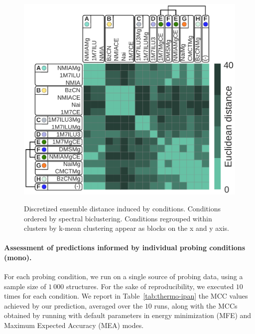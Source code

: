 \documentclass[a4,center,fleqn]{NAR}
\begin{document}
\begin{figure}
	{\centering \includegraphics[width=\linewidth]{graphs/didy/bi_clustering}\\}%
	
	\caption{Discretized ensemble distance induced by conditions. Conditions ordered by spectral biclustering. Conditions regrouped within clusters by k-mean clustering appear as blocks on the x and y axis.}\label{fig:biclustering}
\end{figure}







\paragraph{Assessment of predictions informed by individual probing conditions (mono).}



For each probing condition, we run \OurTool{} on a single source of probing data, using a sample size of $1~000$ structures. For the sake of reproducibility, we executed \OurTool{} $10$ times for each condition. We report in Table~\ref{tab:thermo-ipan} the MCC values achieved by our prediction, averaged over the $10$ runs, along with the MCCs obtained by running  with default parameters in energy minimization (MFE) and Maximum Expected Accuracy (MEA) modes.
\end{document}

